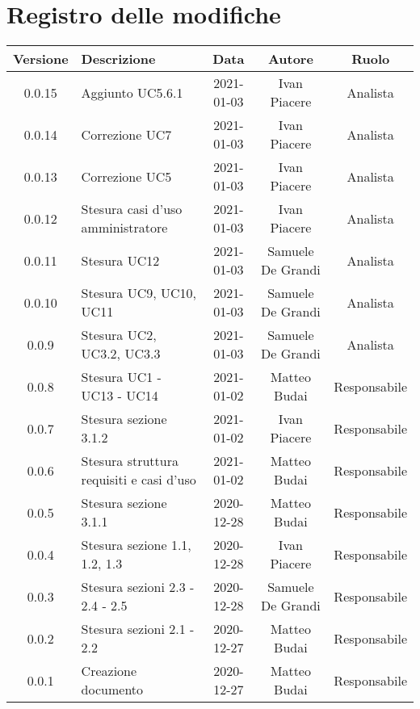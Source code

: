 \section*{Registro delle modifiche}

\begin{center}
	\begin{longtable}{|c|p{5cm}|c|c|c|}
		\hline
		\rowcolor{lighter-grayer}
		\textbf{Versione} & \textbf{Descrizione} & \textbf{Data} & \textbf{Autore} & \textbf{Ruolo} \\
		\hline
		\endfirsthead
		
		0.0.15 & Aggiunto UC5.6.1 & 2021-01-03 & Ivan Piacere & Analista \\
		\hline
		0.0.14 & Correzione UC7 & 2021-01-03 & Ivan Piacere & Analista \\
		\hline
		0.0.13 & Correzione UC5 & 2021-01-03 & Ivan Piacere & Analista \\
		\hline
		0.0.12 & Stesura casi d'uso amministratore & 2021-01-03 & Ivan Piacere & Analista \\
		\hline
		0.0.11 & Stesura UC12  & 2021-01-03 & Samuele De Grandi & Analista \\
		\hline
	    0.0.10 & Stesura UC9, UC10, UC11  & 2021-01-03 & Samuele De Grandi & Analista \\
		\hline
		0.0.9 & Stesura UC2, UC3.2, UC3.3  & 2021-01-03 & Samuele De Grandi & Analista \\
		\hline
		0.0.8 & Stesura UC1 - UC13 - UC14 & 2021-01-02 & Matteo Budai & Responsabile \\
		\hline
		0.0.7 & Stesura sezione 3.1.2 & 2021-01-02 & Ivan Piacere & Responsabile\\
		\hline
		0.0.6 & Stesura struttura requisiti e casi d'uso & 2021-01-02 & Matteo Budai & Responsabile \\
		\hline
		0.0.5 & Stesura sezione 3.1.1 & 2020-12-28 & Matteo Budai & Responsabile \\
		\hline
		0.0.4 & Stesura sezione 1.1, 1.2, 1.3 & 2020-12-28 & Ivan Piacere & Responsabile \\
		\hline
		0.0.3 & Stesura sezioni 2.3 - 2.4 - 2.5 & 2020-12-28 & Samuele De Grandi & Responsabile \\
		\hline
		0.0.2 & Stesura sezioni 2.1 - 2.2 & 2020-12-27 & Matteo Budai & Responsabile \\
		\hline
		0.0.1 & Creazione documento & 2020-12-27 & Matteo Budai & Responsabile \\
		\hline
		
	\end{longtable}
\end{center}
